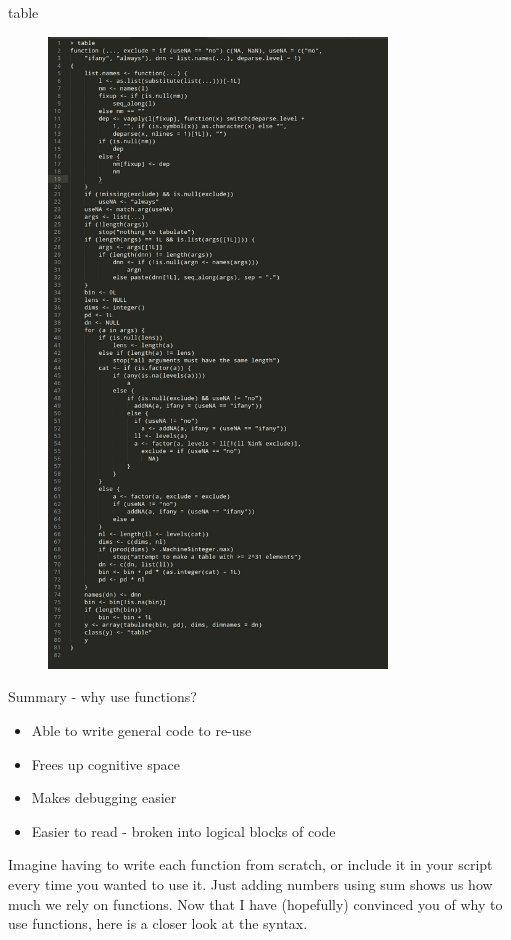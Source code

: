 \documentclass{beamer}\usepackage[]{graphicx}\usepackage[]{color}
\begin{document}
\begin{frame}[fragile]{table}
\begin{figure}[ht!]
\centering
\includegraphics[width=90mm]{pictures/table.png}
\label{overflow}
\end{figure}
\end{frame}


\begin{frame}[fragile]{Summary - why use functions?}

\begin{itemize}
\item Able to write general code to re-use
\item Frees up cognitive space
\item Makes debugging easier
\item Easier to read - broken into logical blocks of code
\end{itemize}
Imagine having to write each function from scratch, or include it in your script every time you wanted to use it.
\linebreak
Just adding numbers using sum shows us how much we rely on functions.
\linebreak
\linebreak
Now that I have (hopefully) convinced you of why to use functions, here is a closer look at the syntax.
\end{frame}
\end{document}

